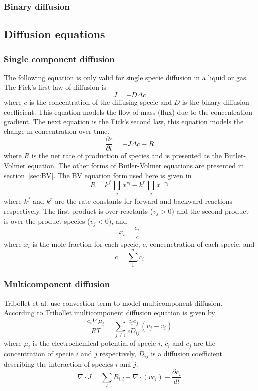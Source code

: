 \documentclass[12pt]{book}
\begin{document}
\subsubsection{Binary diffusion}
\subsection{Diffusion equations}
\subsubsection{Single component diffusion}
The following equation is only valid for single specie diffusion in a liquid or gas.
The Fick's first law of diffusion is 
\begin{equation}
J = -D\Delta c
\end{equation}
where $c$ is the concentration of the diffusing specie and $D$ is the binary diffusion coefficient. This equation models the flow of mass (flux) due to the concentration gradient. The next equation is the Fick's second law, this equation models the change in concentration over time.
\begin{equation}
\frac{\partial c}{\partial t} = -J\Delta c - R
\end{equation}
where $R$ is the net rate of production of species and is presented as the Butler-Volmer equation. The other forms of Butler-Volmer equations are presented in section~\ref{sec:BV}. The BV equation form used here is given in~\cite{Tribollet1984}.
\begin{equation}
R = k^f\prod_{j}x^{v_j}-k^r\prod_{j}x^{-v_j}
\end{equation}
where $k^f$ and $k^r$ are the rate constants for forward and backward reactions respectively. The first product is over reactants ($v_j>0$) and the second product is over the product species ($v_j <0$), and
\begin{equation}
x_i = \frac{c_i}{c}
\end{equation}
where $x_i$ is the mole fraction for each specie, $c_i$ concenctration of each specie, and
\begin{equation}
c= \sum_{1}^{n}c_i
\end{equation}
\subsubsection{Multicomponent diffusion}
Tribollet et al.\cite{Tribollet1984} use convection term to model multicomponent diffusion. According to Tribollet multicomponent diffusion equation is given by
\begin{equation}
	\frac{c_i \nabla\mu_i}{RT} = \sum_{j\neq i}\frac{c_ic_j}{cD_{ij}}\left(v_j - v_i\right)
\end{equation}
where $\mu_i$ is the electrochemical potential of specie $i$, $c_i$ and $c_j$ are the concentration of specie $i$ and $j$ respectively, $D_{ij}$ is a diffusion coefficient describing the interaction of species $i$ and $j$.
\begin{equation}
\nabla\cdot J = \sum_{l}R_{i,l} - \nabla\cdot(vc_i)- \frac{\partial c_i}{dt}
\end{equation}
\end{document}

